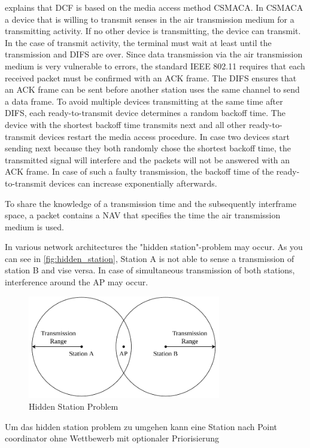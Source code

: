\documentclass[]{nsm-thesis}
\begin{document}
\textcite{sauter_wireless_2022} explains that \ac{DCF} is based on the media access method \ac{CSMACA}. In \ac{CSMACA} a device that is willing to transmit senses in the air transmission medium for a transmitting activity. If no other device is transmitting, the device can transmit. In the case of transmit activity, the terminal must wait at least until the transmission and \ac{DIFS} are over.
Since data transmission via the air transmission medium is very vulnerable to errors, the standard IEEE 802.11 requires that each received packet must be confirmed with an \ac{ACK} frame.
The \ac{DIFS} ensures that an \ac{ACK} frame can be sent before another station uses the same channel to send a data frame. 
To avoid multiple devices transmitting at the same time after \ac{DIFS}, each ready-to-transmit device determines a random backoff time. The device with the shortest backoff time transmits next and all other ready-to-transmit devices restart the media access procedure. In case two devices start sending next because they both randomly chose the shortest backoff time, the transmitted signal will interfere and the packets will not be answered with an \ac{ACK} frame.
In case of such a faulty transmission, the backoff time of the ready-to-transmit devices can increase exponentially afterwards.

To share the knowledge of a transmission time and the subsequently interframe space, a packet contains a \ac{NAV} that specifies the time the air transmission medium is used.

In various network architectures the "hidden station"-problem may occur. As you can see in \autoref{fig:hidden_station}, Station A is not able to sense a transmission of station B and vise versa. In case of simultaneous transmission of both stations, interference around the \ac{AP} may occur. 
\begin{figure}%
	\centering
	\includegraphics[width=0.75\textwidth]{figures/hidden_station.pdf}
	\caption{Hidden Station Problem}%
	\label{fig:hidden_station}%
\end{figure}
Um das hidden station problem zu umgehen kann eine Station nach \textcite{sauter_wireless_2022} 
Point coordinator 
ohne Wettbewerb mit optionaler Priorisierung
\end{document}

